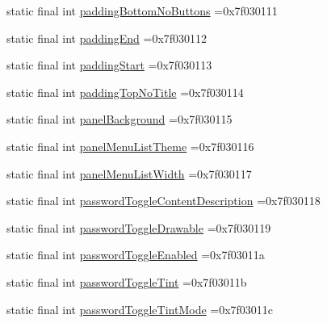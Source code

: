 \begin{DoxyCompactItemize}
static final int \mbox{\hyperlink{classbr_1_1unb_1_1cic_1_1mp_1_1marketmaster_1_1test_1_1R_1_1attr_ac39900e820b70e88042b548b8e904b64}{padding\+Bottom\+No\+Buttons}} =0x7f030111
\item 
static final int \mbox{\hyperlink{classbr_1_1unb_1_1cic_1_1mp_1_1marketmaster_1_1test_1_1R_1_1attr_a6edc8ef62fab901c07f52549192cf35e}{padding\+End}} =0x7f030112
\item 
static final int \mbox{\hyperlink{classbr_1_1unb_1_1cic_1_1mp_1_1marketmaster_1_1test_1_1R_1_1attr_a5df2e22010fa1593cf81f602b979e71e}{padding\+Start}} =0x7f030113
\item 
static final int \mbox{\hyperlink{classbr_1_1unb_1_1cic_1_1mp_1_1marketmaster_1_1test_1_1R_1_1attr_a9011b2a12642131f622f3fe7993ee428}{padding\+Top\+No\+Title}} =0x7f030114
\item 
static final int \mbox{\hyperlink{classbr_1_1unb_1_1cic_1_1mp_1_1marketmaster_1_1test_1_1R_1_1attr_a24f2e9285dd16ba38c8b0a415e55cfbd}{panel\+Background}} =0x7f030115
\item 
static final int \mbox{\hyperlink{classbr_1_1unb_1_1cic_1_1mp_1_1marketmaster_1_1test_1_1R_1_1attr_a310ea604f1f8077f8a1cd16926961ea6}{panel\+Menu\+List\+Theme}} =0x7f030116
\item 
static final int \mbox{\hyperlink{classbr_1_1unb_1_1cic_1_1mp_1_1marketmaster_1_1test_1_1R_1_1attr_afc08622e5fa7004529c2359317a41b6a}{panel\+Menu\+List\+Width}} =0x7f030117
\item 
static final int \mbox{\hyperlink{classbr_1_1unb_1_1cic_1_1mp_1_1marketmaster_1_1test_1_1R_1_1attr_a8f8f09d99efe9b704c854017bbf4eeff}{password\+Toggle\+Content\+Description}} =0x7f030118
\item 
static final int \mbox{\hyperlink{classbr_1_1unb_1_1cic_1_1mp_1_1marketmaster_1_1test_1_1R_1_1attr_a05820e4cf0ac8b83f303051f7c64152c}{password\+Toggle\+Drawable}} =0x7f030119
\item 
static final int \mbox{\hyperlink{classbr_1_1unb_1_1cic_1_1mp_1_1marketmaster_1_1test_1_1R_1_1attr_a48821bfa49c36306615dca4a777fbf94}{password\+Toggle\+Enabled}} =0x7f03011a
\item 
static final int \mbox{\hyperlink{classbr_1_1unb_1_1cic_1_1mp_1_1marketmaster_1_1test_1_1R_1_1attr_ab382d2775c9fd6a6fd97850da41ab143}{password\+Toggle\+Tint}} =0x7f03011b
\item 
static final int \mbox{\hyperlink{classbr_1_1unb_1_1cic_1_1mp_1_1marketmaster_1_1test_1_1R_1_1attr_a0441770c8888023cd7a3c26856f3b5b1}{password\+Toggle\+Tint\+Mode}} =0x7f03011c
\item 

\end{DoxyCompactItemize}
